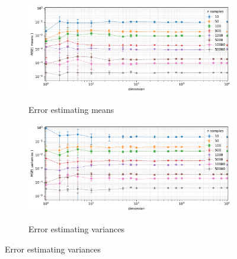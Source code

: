 \begin{figure}[t]
    \centering
    \vspace{-0.5em}
    \begin{subfigure}[b]{0.9\textwidth}
        \centering
        \caption{\small Error estimating means}
        \includegraphics[width=\textwidth]{images/estimation/trend-properties-mse_means(dimension)-n_correlated_0.20-covariance_0.20-samples_10,50,100,500,1000,5000,10000,50000-aggregated.pdf}
        \label{fig:estimation-means}
    \end{subfigure}

    \vspace{-0.5em}
    \begin{subfigure}[b]{0.9\textwidth}
        \centering
        \caption{\small Error estimating variances}
        \includegraphics[width=\textwidth]{images/estimation/trend-properties-mse_vars(dimension)-n_correlated_0.20-covariance_0.20-samples_10,50,100,500,1000,5000,10000,50000-aggregated.pdf}
        \label{fig:estimation-variances}
    \end{subfigure}


\end{figure}
